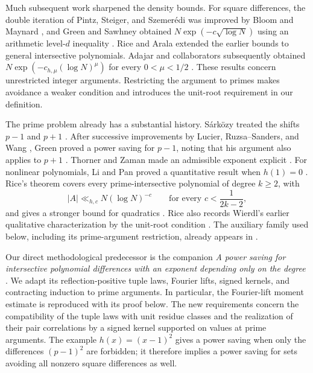 Much subsequent work sharpened the density bounds. For square
differences, the double iteration of Pintz, Steiger, and Szemer\'edi
\cite{PintzSteigerSzemeredi1988} was improved by Bloom and Maynard
\cite{BloomMaynard2022}, and Green and Sawhney obtained
$N\exp(-c\sqrt{\log N})$ using an arithmetic level-$d$ inequality
\cite{GreenSawhney2025}. Rice \cite{Rice2019} and Arala
\cite{Arala2024} extended the earlier bounds to general intersective
polynomials. Adajar and collaborators subsequently obtained
$N\exp(-c_{h,\mu}(\log N)^\mu)$ for every $0<\mu<1/2$
\cite{AdajarEtAl2026}. These results concern unrestricted integer
arguments. Restricting the argument to primes makes avoidance a weaker
condition and introduces the unit-root requirement in our definition.

The prime problem already has a substantial history.
S\'ark\"ozy treated the shifts $p-1$ and $p+1$
\cite{Sarkozy1978III}. After successive improvements by Lucier,
Ruzsa--Sanders, and Wang
\cite{Lucier2008,RuzsaSanders2008,Wang2020}, Green proved a power saving
for $p-1$, noting that his argument also applies to $p+1$
\cite[Theorem~1.1 and the following remarks]{Green2024}.
Thorner and Zaman made an admissible exponent explicit
\cite{ThornerZaman2024}.
For nonlinear polynomials, Li and Pan proved a quantitative result when
$h(1)=0$ \cite{LiPan2009}. Rice's theorem covers every
prime-intersective polynomial of degree $k\ge2$, with
\[
 |A|\ll_{h,c}N(\log N)^{-c}
 \qquad\text{for every }c<\frac{1}{2k-2},
\]
and gives a stronger bound for quadratics
\cite[Theorems~1 and~2]{Rice2013}. Rice also records Wierdl's earlier
qualitative characterization by the unit-root condition
\cite[Section~1.2]{Rice2013}. The auxiliary family used below, including
its prime-argument restriction, already appears in
\cite[Section~2.1]{Rice2013}.

Our direct methodological predecessor is the companion
\emph{A power saving for intersective polynomial differences with an exponent depending only on the degree}
\cite{IntersectivePower}. We adapt its reflection-positive tuple laws,
Fourier lifts, signed kernels, and contracting induction to prime
arguments. In particular, the Fourier-lift moment estimate is reproduced
with its proof below. The new requirements concern the compatibility
of the tuple laws with unit residue classes and the realization of
their pair correlations by a signed kernel supported on values at
prime arguments. The example $h(x)=(x-1)^2$ gives a power saving when
only the differences $(p-1)^2$ are forbidden; it therefore implies a
power saving for sets avoiding all nonzero square differences as well.

